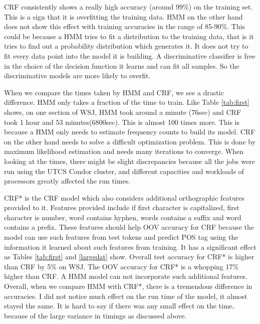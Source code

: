 \documentclass[twocolumn]{article}
\begin{document}
CRF consistently shows a really high accuracy (around 99\%) on the training set. This is a sign that it is overfitting the training data. HMM on the other hand does not show this effect with training accuracies in the range of 85-90\%. This could be because a HMM tries to fit a distribution to the training data, that is it tries to find out a probability distribution which generates it. It does not try to fit every data point into the model it is building. A discriminative classifier is free in the choice of the decision function it learns and can fit all samples. So the discriminative models are more likely to overfit.


When we compare the times taken by HMM and CRF, we see a drastic difference. HMM only takes a fraction of the time to train. Like Table \ref{tab:first} shows, on one section of WSJ, HMM took around a minute (76sec) and CRF took 1 hour and 53 minutes(6800sec). This is almost 100 times more. This is because a HMM only needs to estimate frequency counts to build its model. CRF on the other hand needs to solve a difficult optimization problem. This is done by maximum likelihood estimation and needs many iterations to converge. When looking at the times, there might be slight discrepancies because all the jobs were run using the UTCS Condor cluster, and different capacities and workloads of processors greatly affected the run times.


CRF* is the CRF model which also considers additional orthographic features provided to it. Features provided include if first character is capitalized, first character is number, word contains hyphen, words contains a suffix and word contains a prefix. These features should help OOV accuracy for CRF  because the model can use such features from test tokens and predict POS tag using the information it learned about such features from training. It has a significant effect as Tables \ref{tab:first} and \ref{largedat} show. Overall test accuracy for CRF* is higher than CRF by 5\% on WSJ. The OOV accuracy for CRF* is a whopping 17\% higher than CRF. A HMM model can not incorporate such additional features. Overall, when we compare HMM with CRF*, there is a tremendous difference in accuracies. I did not notice much effect on the run time of the model, it almost stayed the same. It is hard to say if there was any small effect on the time, because of the large variance in timings as discussed above.
\end{document}
